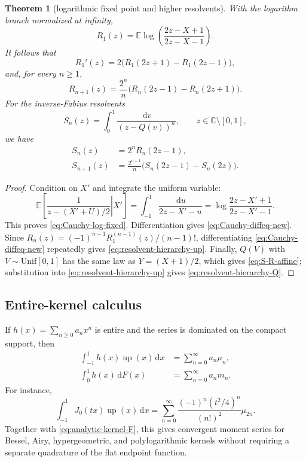 \documentclass[11pt,oneside]{article}
\newtheorem{theorem}{Theorem}[section]
\theoremstyle{definition}
\newcommand{\F}{F}
\newcommand{\Q}{Q}
\newcommand{\upf}{\operatorname{up}}
\newcommand{\E}{\mathbb E}
\newcommand{\C}{\mathbb C}
\newcommand{\dd}{\,\mathrm d}
\begin{document}
\begin{theorem}[logarithmic fixed point and higher resolvents]
\label{thm:Cauchy-fixed-hierarchy}
With the logarithm branch normalized at infinity,
\begin{equation}\label{eq:Cauchy-log-fixed}
 \boxed{
 R_1(z)=\E\log\!\left(\frac{2z-X+1}{2z-X-1}\right).}
\end{equation}
It follows that
\begin{equation}\label{eq:Cauchy-diffeq-new}
 R_1'(z)=2\bigl(R_1(2z+1)-R_1(2z-1)\bigr),
\end{equation}
and, for every \(n\ge1\),
\begin{equation}\label{eq:resolvent-hierarchy-up}
 \boxed{
 R_{n+1}(z)
 =\frac{2^n}{n}\bigl(R_n(2z-1)-R_n(2z+1)\bigr).}
\end{equation}
For the inverse-Fabius resolvents
\begin{equation}\label{eq:Sn-def}
 S_n(z)=\int_0^1\frac{\dd v}{(z-\Q(v))^n},
 \qquad z\in\C\setminus[0,1],
\end{equation}
we have
\begin{align}
 S_n(z)&=2^nR_n(2z-1),
 \label{eq:S-R-affine}\\
 S_{n+1}(z)
 &=\frac{2^{n+1}}n\bigl(S_n(2z-1)-S_n(2z)\bigr).
 \label{eq:resolvent-hierarchy-Q}
\end{align}
\end{theorem}

\begin{proof}
Condition on \(X'\) and integrate the uniform variable:
\[
 \E\left[\left.\frac1{z-(X'+U)/2}\right|X'\right]
 =\int_{-1}^1\frac{\dd u}{2z-X'-u}
 =\log\frac{2z-X'+1}{2z-X'-1}.
\]
This proves \eqref{eq:Cauchy-log-fixed}.  Differentiation gives
\eqref{eq:Cauchy-diffeq-new}.  Since
\(
 R_n(z)=(-1)^{n-1}R_1^{(n-1)}(z)/(n-1)!
\), differentiating \eqref{eq:Cauchy-diffeq-new} repeatedly gives
\eqref{eq:resolvent-hierarchy-up}.  Finally, \(\Q(V)\) with
\(V\sim\mathrm{Unif}[0,1]\) has the same law as \(Y=(X+1)/2\), which gives
\eqref{eq:S-R-affine}; substitution into \eqref{eq:resolvent-hierarchy-up} gives
\eqref{eq:resolvent-hierarchy-Q}.
\end{proof}


\subsection{Entire-kernel calculus}

If \(h(x)=\sum_{n\ge0}a_nx^n\) is entire and the series is dominated on the compact
support, then
\begin{align}
 \int_{-1}^1h(x)\upf(x)\dd x
 &=\sum_{n=0}^{\infty}a_n\mu_n,
 \label{eq:entire-kernel-up}\\
 \int_0^1h(x)\dd\F(x)
 &=\sum_{n=0}^{\infty}a_nm_n.
 \label{eq:entire-kernel-dF}
\end{align}
For instance,
\begin{equation}\label{eq:Bessel-up}
 \int_{-1}^1J_0(tx)\upf(x)\dd x
 =\sum_{n=0}^{\infty}
 \frac{(-1)^n(t^2/4)^n}{(n!)^2}\mu_{2n}.
\end{equation}
Together with \cref{eq:analytic-kernel-F}, this gives convergent moment series for
Bessel, Airy, hypergeometric, and polylogarithmic kernels without requiring a separate
quadrature of the flat endpoint function.
\end{document}
